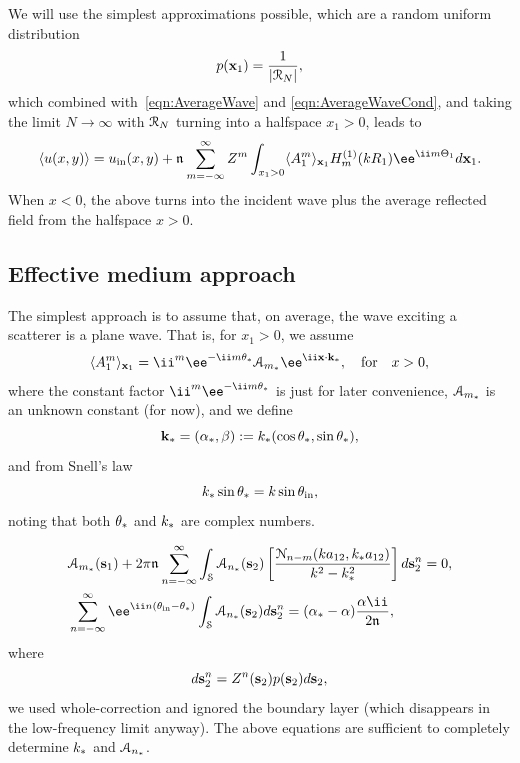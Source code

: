 \documentclass[ 12pt, a4paper]{article}
\renewcommand {\Lam}[1]{\mathbf x_{#1}}
\begin{document}
We will use the simplest approximations possible, which are a random uniform distribution
\begin{equation}
\p(\Lam 1) = \frac{1}{|\reg|},
\label{eqn:pLam1}
\end{equation}
which combined with~\eqref{eqn:AverageWave} and \eqref{eqn:AverageWaveCond}, and taking the limit $N \to \infty$ with ${\mathcal R_N}$ turning into a halfspace $x_1>0$, leads to
\begin{equation}
  \ensem{u(x,y)} = u_\inc(x,y)+   \nfrac {} \sum_{m=-\infty}^\infty \scatZ^m \int_{x_1>0}   \ensem{A_1^m}_{\mathbf x_1}  H_m^{(1)}(k R_1) \ee^{\ii m \Theta_1}  d \mathbf x_1.
  \label{eqn:AverageReflection}
\end{equation}
When $x <0$, the above turns into the incident wave plus the average reflected field from the halfspace $x>0$.

\subsection{Effective medium approach}

The simplest approach is to assume that, on average, the wave exciting a scatterer is a plane wave.
That is, for $x_1 > 0$, we assume
\begin{align}
  \ensem{A_1^m}_{\mathbf x_1} =  \ii^m \ee^{-\ii m \theta_\eff} \A{m_\eff} \ee^{\ii \mathbf x \cdot \mathbf k_\eff}, \quad \text{for} \quad x>{0},
  \label{eqn:AnsatzA}
\end{align}
where the constant factor $\ii^m \ee^{-\ii m \theta_\eff}$ is just for later convenience, $\mathcal A_{m_*}$ is an unknown constant (for now), and we define
\begin{equation}
  \mathbf k_* =(\alpha_*, \beta) := k_*(\cos\theta_*, \sin\theta_*),
\end{equation}
and from Snell's law
\begin{equation}
  k_* \sin \theta_* = k \sin \theta_{\mathrm{in}},
\end{equation}
  noting that both $\theta_*$ and $k_*$ are complex numbers.

\begin{align}
    & \A{m_\eff}(\s_1)  +  2 \pi \nfrac {} \sum_{n=-\infty}^\infty\int_\regS  \A{n_\eff}(\s_2)
  \left [ \frac{\mathcal N_{n-m}(ka_{12},k_\eff a_{12})}{k^2 - k_\eff^2} \right]
    d\s_2^n
   = 0,
 \label{eqn:AmT}
\\
  &
   \sum_{n=-\infty}^\infty \ee^{\ii n (\theta_\inc - \theta_\eff)} \int_\regS
   \A{n_\eff}(\s_2) d\s_2^n = (\alpha_\eff-\alpha) \frac{\alpha \ii}{2 \nfrac {} },
 \label{eqn:AmInc}
 \end{align}
 where
\begin{equation}
  d \mathbf s_2^n = Z^n(\mathbf s_2) p(\mathbf s_2) d\mathbf s_2,
\end{equation}
 we used whole-correction and ignored the boundary layer (which disappears in the low-frequency limit anyway). The above equations are sufficient to completely determine $k_*$ and $\mathcal A_{n_*}$.
\end{document}
